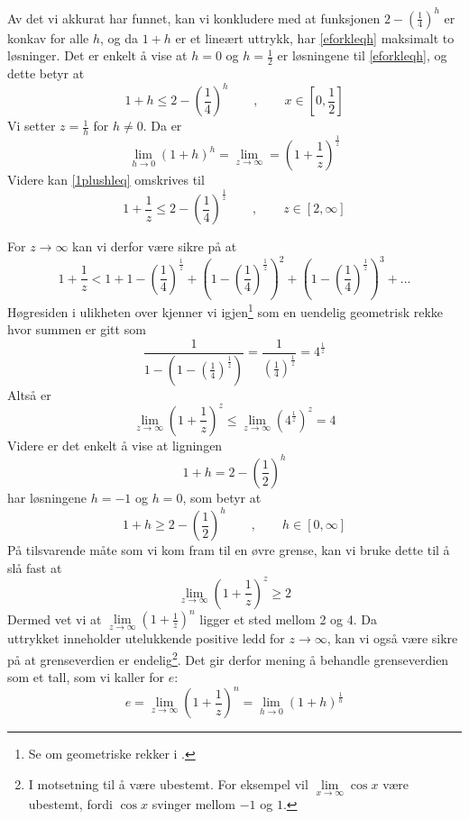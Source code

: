 \newpage
Av det vi akkurat har funnet, kan vi konkludere med at funksjonen $2-\left(\frac{1}{4}\right)^h $ er konkav for alle $ h $, og da $ 1+h$ er et lineært uttrykk, har \eqref{eforkleqh} maksimalt to løsninger. Det er enkelt å vise at $ h=0 $ og $ h=\frac{1}{2} $ er løsningene til \eqref{eforkleqh}, og dette betyr at
\begin{equation}\label{1plushleq}
1+h\leq 2-\left(\frac{1}{4}\right)^h\qquad,\qquad x\in\left[0, \frac{1}{2}\right] 	
\end{equation}
Vi setter $z=\frac{1}{h} $ for $ h\neq0 $. Da er
\[ \lim\limits_{h\to 0} (1+h)^h=\lim\limits_{z\to\infty}=\left(1+\frac{1}{z}\right)^\frac{1}{z} \]
Videre kan \eqref{1plushleq} omskrives til
\begin{equation}\label{eforkleqz}
	1+\frac{1}{z}\leq 2-\left(\frac{1}{4}\right)^\frac{1}{z}\qquad,\qquad z\in[2, \infty]
\end{equation}

For $ z\to\infty $ kan vi derfor være sikre på at
\[ 1+\frac{1}{z}<1+1-\left(\frac{1}{4}\right)^\frac{1}{z}+\left(1-\left(\frac{1}{4}\right)^\frac{1}{z}\right)^2+\left(1-\left(\frac{1}{4}\right)^\frac{1}{z}\right)^3+... \]
Høgresiden i ulikheten over kjenner vi igjen\footnote{Se om geometriske rekker i \tmto.} som en uendelig geometrisk rekke hvor summen er gitt som
\[ \frac{1}{1-\left(1-\left(\frac{1}{4}\right)^\frac{1}{z}\right)} =\frac{1}{\left(\frac{1}{4}\right)^\frac{1}{z}}=4^\frac{1}{z} \]
Altså er
\begin{equation}\label{eforkllim4}
	\lim\limits_{z\to\infty}\left(1+\frac{1}{z}\right)^z\leq \lim\limits_{z\to\infty}\left(4^\frac{1}{z}\right)^z=4
\end{equation}
\newpage
Videre er det enkelt å vise at ligningen
\[ 1+h=2-\left(\frac{1}{2}\right)^h \]
har løsningene $ h=-1 $ og $ h=0 $, som betyr at
\[ 1+h\geq2-\left(\frac{1}{2}\right)^h \qquad,\qquad h\in[0, \infty]\]
På tilsvarende måte som vi kom fram til en øvre grense, kan vi bruke dette til å slå fast at
\[ \lim\limits_{z\to \infty}\left(1 + \frac{1}{z}\right)^z\geq 2 \] 
Dermed vet vi at $ \lim\limits_{z\to\infty }\left(1+\frac{1}{z}\right)^n $ ligger et sted mellom 2 og 4. Da\\ uttrykket inneholder utelukkende positive ledd for $ {z\to\infty} $, kan vi også være sikre på at grenseverdien er endelig\footnote{I motsetning til å være ubestemt. For eksempel vil $ \lim\limits_{x\to \infty} \cos x $  være ubestemt, fordi $ \cos x $ svinger mellom $ -1 $ og $ 1 $.}. Det gir derfor mening å behandle grenseverdien som et tall, som vi kaller for $ e $:
\[ e=\lim\limits_{z\to\infty }\left(1+\frac{1}{z}\right)^n=\lim\limits_{h\to0}\left(1+h\right)^{\frac{1}{h}}  \]
